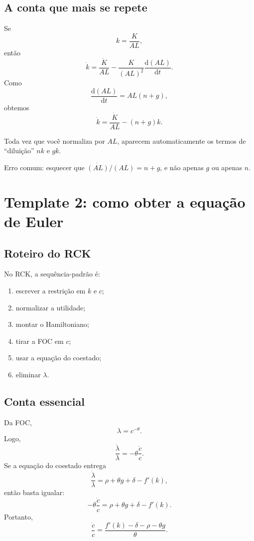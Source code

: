\documentclass[11pt,a4paper]{article}
\newcommand{\dd}{\mathrm{d}}
\begin{document}
\subsection{A conta que mais se repete}

Se
\[
k=\frac{K}{AL},
\]
ent\~ao
\[
\dot{k}
=
\frac{\dot K}{AL}
-
\frac{K}{(AL)^2}\frac{\dd(AL)}{\dd t}.
\]
Como
\[
\frac{\dd(AL)}{\dd t}=AL(n+g),
\]
obtemos
\[
\dot{k}=\frac{\dot K}{AL}-(n+g)k.
\]

\begin{resultado}
Toda vez que voc\^e normaliza por \(AL\), aparecem automaticamente os termos
de ``dilui\c{c}\~ao'' \(nk\) e \(gk\).
\end{resultado}

\begin{armadilha}
Erro comum: esquecer que \(\dot{(AL)}/(AL)=n+g\), e n\~ao apenas \(g\) ou apenas \(n\).
\end{armadilha}

\section{Template 2: como obter a equa\c{c}\~ao de Euler}

\subsection{Roteiro do RCK}

No RCK, a sequ\^encia-padr\~ao \'e:
\begin{enumerate}
  \item escrever a restri\c{c}\~ao em \(k\) e \(c\);
  \item normalizar a utilidade;
  \item montar o Hamiltoniano;
  \item tirar a FOC em \(c\);
  \item usar a equa\c{c}\~ao do coestado;
  \item eliminar \(\lambda\).
\end{enumerate}

\subsection{Conta essencial}

Da FOC,
\[
\lambda=c^{-\theta}.
\]
Logo,
\[
\frac{\dot\lambda}{\lambda}=-\theta\frac{\dot c}{c}.
\]
Se a equa\c{c}\~ao do coestado entrega
\[
\frac{\dot\lambda}{\lambda}=\rho+\theta g+\delta-f'(k),
\]
ent\~ao basta igualar:
\[
-\theta\frac{\dot c}{c}
=
\rho+\theta g+\delta-f'(k).
\]
Portanto,
\[
\frac{\dot c}{c}
=
\frac{f'(k)-\delta-\rho-\theta g}{\theta}.
\]
\end{document}
